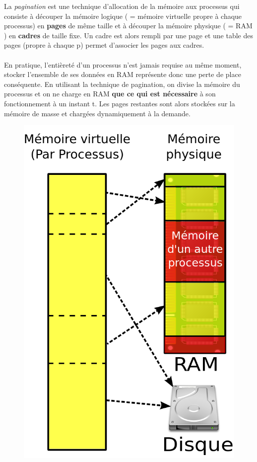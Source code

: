 {
La \textit{pagination} est une technique d'allocation de la mémoire aux processus qui consiste à découper la mémoire logique ( = mémoire virtuelle propre à chaque processus) en \textbf{pages} de même taille et à découper la mémoire physique ( = RAM ) en \textbf{cadres} de taille fixe. Un cadre est alors rempli par une page et une table des pages (propre à chaque p) permet d'associer les pages aux cadres.

\paragraph{}
En pratique, l'entièreté d'un processus n'est jamais requise au même moment, stocker l'ensemble de ses données en RAM représente donc une perte de place conséquente. En utilisant la technique de pagination, on divise la mémoire du processus et on ne charge en RAM \textbf{que ce qui est nécessaire} à son fonctionnement à un instant t. Les pages restantes sont alors stockées sur la mémoire de masse et chargées dynamiquement à la demande.

\begin{figure}[!h]
\center\includegraphics[scale=.2]{images/memoire-virtuelle}
\end{figure}

}
